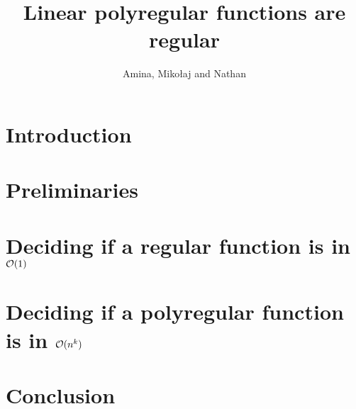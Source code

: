 \documentclass{article}
\begin{document}
 \title{Linear polyregular functions are regular}
 \author{Amina, Miko\l aj and Nathan}
 \maketitle

\tableofcontents

\section*{Introduction}

\section{Preliminaries}

\section{Deciding if a regular function is in ${\mathcal O}(1)$}

\section{Deciding if a polyregular function is in ${\mathcal O}(n^k)$}

\section{Conclusion}




\end{document}
